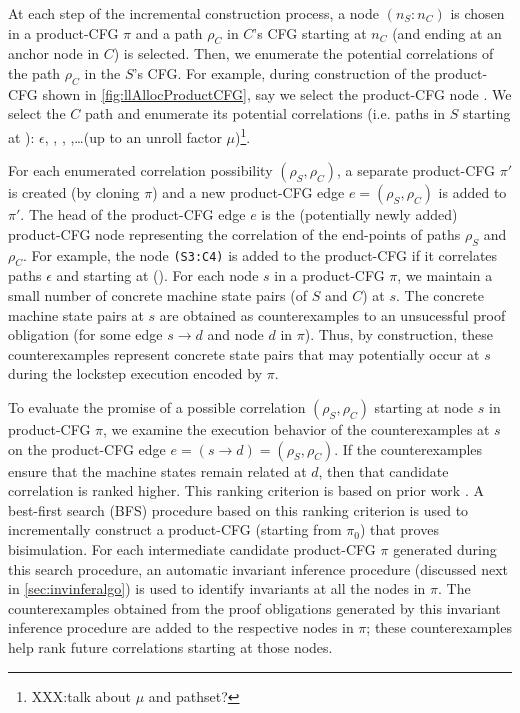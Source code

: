 At each step of the incremental construction process, a node $(n_S\!:\!n_C)$ is chosen in a product-CFG $\pi$
and a path $\rho_C$ in $C$'s CFG starting at $n_C$ (and ending at an anchor node in $C$) is selected.
Then, we enumerate the potential correlations of the path $\rho_C$ in the $S$'s CFG.
For example, during construction of the product-CFG shown in \cref{fig:llAllocProductCFG},
say we select the product-CFG node .
We select the $C$ path  and enumerate its potential correlations (i.e. paths in $S$ starting at ):
$\epsilon$, , , ,\ldots (up to an unroll factor $\mu$)\footnote{XXX:talk about $\mu$ and pathset?}.

For each enumerated correlation possibility $(\rho_S,\rho_C)$, a separate product-CFG $\pi'$ is
created (by cloning $\pi$) and a new product-CFG edge $e=(\rho_S,\rho_C)$ is added to $\pi'$.
The head of the product-CFG edge $e$ is the (potentially newly added) product-CFG node representing
the correlation of the end-points of paths $\rho_S$ and $\rho_C$. For example, the node {\tt (S3:C4)} is added
to the product-CFG if it correlates paths $\epsilon$ and  starting at ().
For each node $s$ in a product-CFG $\pi$, we maintain a small number of
concrete machine state pairs (of $S$ and $C$) at $s$.
The concrete machine state pairs at $s$ are obtained as counterexamples to an unsucessful proof
obligation  (for some edge $s \rightarrow d$ and node $d$ in $\pi$).
Thus, by construction, these counterexamples represent concrete state pairs that may potentially occur
at $s$ during the lockstep execution encoded by $\pi$.

To evaluate the promise of a possible correlation $(\rho_S,\rho_C)$ starting at node $s$
in product-CFG $\pi$, we examine the execution behavior of the counterexamples at $s$ on
the product-CFG edge $e=(s\rightarrow d)=(\rho_S,\rho_C)$.
If the counterexamples ensure that the machine states remain related at $d$,
then that candidate correlation is ranked higher.
This ranking criterion is based on prior work \cite{oopsla20}.
A best-first search (BFS) procedure based on this ranking criterion is used to incrementally construct
a product-CFG (starting from $\pi_0$) that proves bisimulation.
For each intermediate candidate product-CFG $\pi$ generated during this search procedure,
an automatic invariant inference procedure (discussed next in \cref{sec:invinferalgo}) is
used to identify invariants at all the nodes in $\pi$.
The counterexamples obtained from the proof obligations generated by this invariant inference
procedure are added to the respective nodes in $\pi$; these counterexamples help rank
future correlations starting at those nodes.

